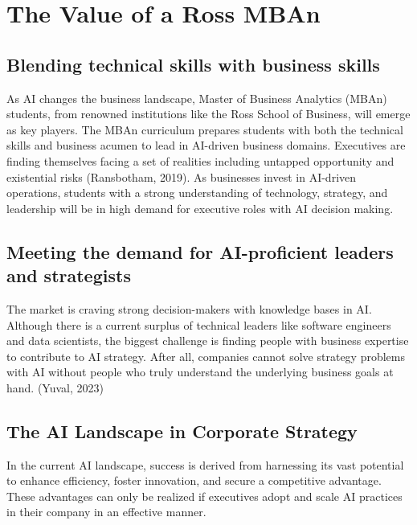 \documentclass[
]{book}
\begin{document}
\hypertarget{the-value-of-a-ross-mban}{%
\chapter{The Value of a Ross MBAn}\label{the-value-of-a-ross-mban}}

\hypertarget{blending-technical-skills-with-business-skills}{%
\section{Blending technical skills with business skills}\label{blending-technical-skills-with-business-skills}}

As AI changes the business landscape, Master of Business Analytics (MBAn) students, from renowned institutions like the Ross School of Business, will emerge as key players. The MBAn curriculum prepares students with both the technical skills and business acumen to lead in AI-driven business domains. Executives are finding themselves facing a set of realities including untapped opportunity and existential risks (Ransbotham, 2019). As businesses invest in AI-driven operations, students with a strong understanding of technology, strategy, and leadership will be in high demand for executive roles with AI decision making.

\hypertarget{meeting-the-demand-for-ai-proficient-leaders-and-strategists}{%
\section{Meeting the demand for AI-proficient leaders and strategists}\label{meeting-the-demand-for-ai-proficient-leaders-and-strategists}}

The market is craving strong decision-makers with knowledge bases in AI. Although there is a current surplus of technical leaders like software engineers and data scientists, the biggest challenge is finding people with business expertise to contribute to AI strategy. After all, companies cannot solve strategy problems with AI without people who truly understand the underlying business goals at hand. (Yuval, 2023)

\hypertarget{the-ai-landscape-in-corporate-strategy}{%
\section{The AI Landscape in Corporate Strategy}\label{the-ai-landscape-in-corporate-strategy}}

In the current AI landscape, success is derived from harnessing its vast potential to enhance efficiency, foster innovation, and secure a competitive advantage. These advantages can only be realized if executives adopt and scale AI practices in their company in an effective manner.
\end{document}
